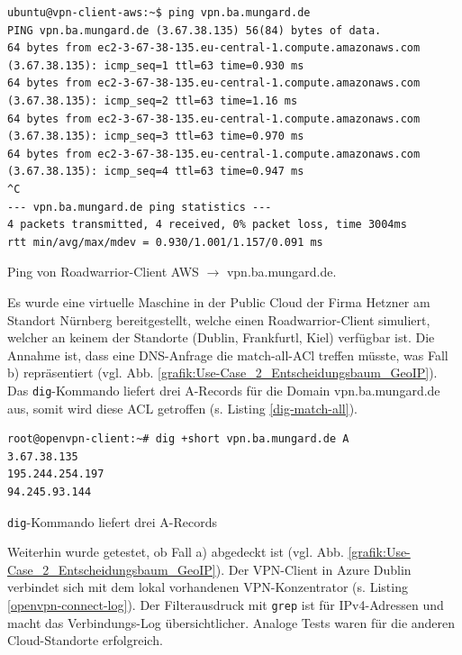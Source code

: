 \begin{listing}[h]
\begin{verbatim}
ubuntu@vpn-client-aws:~$ ping vpn.ba.mungard.de
PING vpn.ba.mungard.de (3.67.38.135) 56(84) bytes of data.
64 bytes from ec2-3-67-38-135.eu-central-1.compute.amazonaws.com (3.67.38.135): icmp_seq=1 ttl=63 time=0.930 ms
64 bytes from ec2-3-67-38-135.eu-central-1.compute.amazonaws.com (3.67.38.135): icmp_seq=2 ttl=63 time=1.16 ms
64 bytes from ec2-3-67-38-135.eu-central-1.compute.amazonaws.com (3.67.38.135): icmp_seq=3 ttl=63 time=0.970 ms
64 bytes from ec2-3-67-38-135.eu-central-1.compute.amazonaws.com (3.67.38.135): icmp_seq=4 ttl=63 time=0.947 ms
^C
--- vpn.ba.mungard.de ping statistics ---
4 packets transmitted, 4 received, 0% packet loss, time 3004ms
rtt min/avg/max/mdev = 0.930/1.001/1.157/0.091 ms

\end{verbatim}
\caption{Ping von Roadwarrior-Client AWS $\rightarrow$ vpn.ba.mungard.de.}
\label{ping-aws-ip}
\end{listing}\FloatBarrier
Es wurde eine virtuelle Maschine in der Public Cloud der Firma Hetzner am Standort Nürnberg bereitgestellt, welche einen \gls{Roadwarrior}-\gls{Client} simuliert, welcher an keinem der Standorte (Dublin, Frankfurtl, Kiel) verfügbar ist. Die Annahme ist, dass eine \gls{DNS}-Anfrage die \glqq match-all\grqq-ACl treffen müsste, was Fall b) repräsentiert (vgl. Abb. \ref{grafik:Use-Case_2_Entscheidungsbaum_GeoIP}). Das \texttt{dig}-Kommando liefert drei A-Records für die Domain vpn.ba.mungard.de aus, somit wird diese \gls{ACL} getroffen (s. Listing \ref{dig-match-all}).
\begin{listing}[h]
\begin{verbatim}
root@openvpn-client:~# dig +short vpn.ba.mungard.de A
3.67.38.135
195.244.254.197
94.245.93.144

\end{verbatim}
\caption{\texttt{dig}-Kommando liefert drei A-Records}
\label{dig-match-all}
\end{listing}\FloatBarrier
\newpage
Weiterhin wurde getestet, ob Fall a) abgedeckt ist (vgl. Abb. \ref{grafik:Use-Case_2_Entscheidungsbaum_GeoIP}). Der VPN-\gls{Client} in Azure Dublin verbindet sich mit dem lokal vorhandenen \gls{VPN-Konzentrator} (s. Listing \ref{openvpn-connect-log}).
Der Filterausdruck mit \texttt{grep} ist für IPv4-Adressen und macht das Verbindungs-Log übersichtlicher. Analoge Tests waren für die anderen Cloud-Standorte erfolgreich.
